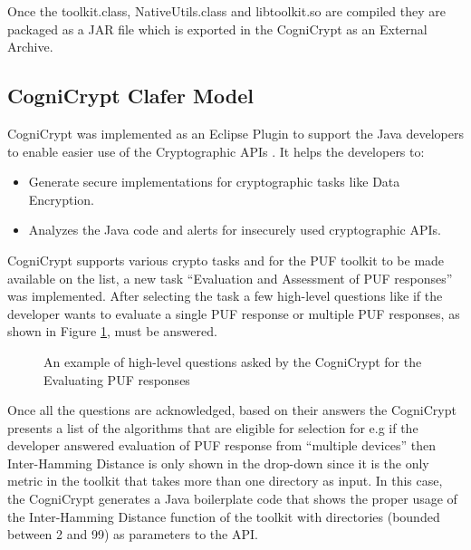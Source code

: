 Once the toolkit.class, NativeUtils.class and libtoolkit.so are compiled they are packaged as a JAR file which is exported in the CogniCrypt as an External Archive.

\subsection{CogniCrypt Clafer Model}
CogniCrypt was implemented as an Eclipse Plugin to support the Java developers to enable easier use of the Cryptographic APIs \cite{cogni}. It helps the developers to:
\begin{itemize}
	\item Generate secure implementations for cryptographic tasks like Data Encryption.
	\item Analyzes the Java code and alerts for insecurely used cryptographic APIs.
\end{itemize}

CogniCrypt supports various crypto tasks and for the PUF toolkit to be made available on the list, a new task ``Evaluation and Assessment of PUF responses'' was implemented. After selecting the task a few high-level questions like if the developer wants to evaluate a single PUF response or multiple PUF responses, as shown in Figure \ref{img:cogni_ques}, must be answered.\\

\begin{figure}[h]
\centering
{}
\caption{An example of high-level questions asked by the CogniCrypt for the Evaluating PUF responses}
\label{img:cogni_ques}
\end{figure}

Once all the questions are acknowledged, based on their answers the CogniCrypt presents a list of the algorithms that are eligible for selection for e.g if the developer answered evaluation of PUF response from ``multiple devices'' then Inter-Hamming Distance is only shown in the drop-down since it is the only metric in the toolkit that takes more than one directory as input. In this case, the CogniCrypt generates a Java boilerplate code that shows the proper usage of the Inter-Hamming Distance
function of the toolkit with directories (bounded between 2 and 99) as parameters to the API.\\


